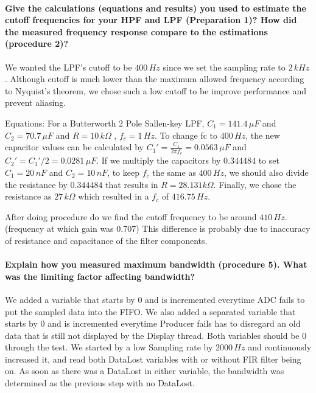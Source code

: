 \documentclass[a4paper]{article}
\begin{document}
\paragraph{Give the calculations (equations and results) you used to estimate the cutoff frequencies for your HPF and LPF (Preparation 1)? How did the measured frequency response compare to the estimations (procedure 2)?\\}

We wanted the LPF's cutoff to be $400\,Hz$ since we set the sampling rate to $2\,kHz$. Although cutoff is much lower than the maximum allowed
frequency according to Nyquist's theorem, we chose such a low cutoff to be improve performance and prevent aliasing.

Equations:
For a Butterworth 2 Pole Sallen-key LPF, $C_1 = 141.4\,\mu F$ and $C_2 = 70.7\,\mu F$ and $R = 10\,k\Omega$ , $f_c = 1\,Hz$.
To change fc to $400\,Hz$, the new capacitor values can be calculated by $C_1' = \frac{C_1}{2 \pi f_c} = 0.0563\,\mu F$ and
$C_2' = C_1'/2 = 0.0281\,\mu F$. If we multiply the capacitors by $0.344484$ to set $C_1 = 20\,nF$ and $C_2 = 10\,nF$, to keep $f_c$
the same as $400\,Hz$, we should also divide the resistance by $0.344484$ that results in $R = 28.131 k\Omega$.
Finally, we chose the resistance as $27\,k\Omega$ which resulted in a $f_c$ of $416.75\,Hz$.

After doing procedure do we find the cutoff frequency to be around $410\,Hz$. (frequency at which gain was 0.707) This difference is probably due to inaccuracy of resistance and capacitance of the filter components.
 
\paragraph{Explain how you measured maximum bandwidth (procedure 5). What was the limiting factor affecting 
bandwidth?\\}

We added a variable that starts by 0 and is incremented everytime ADC fails to put the sampled data into the FIFO. We also added a separated variable that starts by 0 and is incremented everytime Producer fails has to disregard an old data that is still not displayed by the Display thread. Both variables should be 0 through the test. We started by a low Sampling rate by $2000\,Hz$ and continuously increased it, and read both DataLost variables with or without FIR filter being on. As soon as there was a DataLost in either variable, the bandwidth was determined as the previous step with no DataLost.
\end{document}
